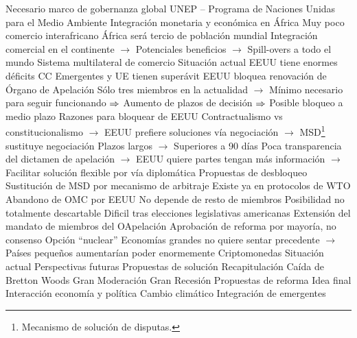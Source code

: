 \documentclass{nuevotema}
\begin{document}
\begin{esquemal}
				\4[$\then$] Necesario marco de gobernanza global
				\4[] UNEP -- Programa de Naciones Unidas para el Medio Ambiente
			\3 Integración monetaria y económica en África
				\4 Muy poco comercio interafricano
				\4 África será tercio de población mundial
				\4 Integración comercial en el continente
				\4[] $\to$ Potenciales beneficios
				\4[] $\to$ Spill-overs a todo el mundo
		\2 Sistema multilateral de comercio
			\3 Situación actual
				\4 EEUU tiene enormes déficits CC
				\4 Emergentes y UE tienen superávit
				\4 EEUU bloquea renovación de Órgano de Apelación
				\4[] Sólo tres miembros en la actualidad
				\4[] $\to$ Mínimo necesario para seguir funcionando
				\4[] $\then$ Aumento de plazos de decisión
				\4[] $\then$ Posible bloqueo a medio plazo
				\4 Razones para bloquear de EEUU
				\4[] Contractualismo vs constitucionalismo
				\4[] $\to$ EEUU prefiere soluciones vía negociación
				\4[] $\to$ MSD\footnote{Mecanismo de solución de disputas.} sustituye negociación
				\4[] Plazos largos
				\4[] $\to$ Superiores a 90 días
				\4[] Poca transparencia del dictamen de apelación
				\4[] $\to$ EEUU quiere partes tengan más información
				\4[] $\to$ Facilitar solución flexible por vía diplomática
			\3 Propuestas de desbloqueo
				\4 Sustitución de MSD por mecanismo de arbitraje
				\4[] Existe ya en protocolos de WTO
				\4 Abandono de OMC por EEUU
				\4[] No depende de resto de miembros
				\4[] Posibilidad no totalmente descartable
				\4[] Dificil tras elecciones legislativas americanas
				\4 Extensión del mandato de miembros del OApelación
				\4 Aprobación de reforma por mayoría, no consenso
				\4[] Opción ``nuclear''
				\4[] Economías grandes no quiere sentar precedente
				\4[] $\to$ Países pequeños aumentarían poder enormemente
		\2 Criptomonedas
			\3 Situación actual
			\3 Perspectivas futuras
			\3 Propuestas de solución
	\1[] 
		\2 Recapitulación
			\3 Caída de Bretton Woods
			\3 Gran Moderación
			\3 Gran Recesión
			\3 Propuestas de reforma
		\2 Idea final
			\3 Interacción economía y política
			\3 Cambio climático
			\3 Integración de emergentes
\end{esquemal}
\end{document}
